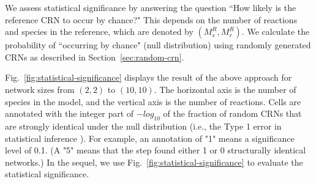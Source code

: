 \documentclass[webpdf,contemporary,large]{oup-authoring-template}
\newcommand{\revision}[1]{\color{red}{#1 }\color{black}}
\newcommand{\eqnref}[1]{
  Eq.~\ref{#1}}
\newcommand{\fig}[1]{
  Fig.~\ref{#1}}
\newcommand{\secref}[1]{Section~\ref{#1}}
\theoremstyle{thmstyleone}%
\theoremstyle{thmstyletwo}%
\theoremstyle{thmstylethree}%
\begin{document}
We assess statistical significance by answering the question ``How likely is the reference CRN to occur by chance?"
This depends on the number of reactions and species in the reference, which are denoted by $(M^R_s, M^R_r)$.
We calculate the probability of ``occurring by chance" (null distribution)
using
randomly generated CRNs as described in \secref{sec:random-crn}.
\revision{
\begin{itemize}
    \item Step (1): generate $K^R$ reference CRNs with size $(M_s^R, M_r^R)$;
    \item Step (2): generate $K^T$ target CRNs also of size $(M_s^R, M_r^R)$;
    \item Step (3): for each reference CRN in step (1), count the number of target CRNs in step (2) that are strongly structurally identical, and report the fraction of occurrences of strong structural identity.
\end{itemize}
$K^R$, $K^R$ should be sufficiently large so that there is little variability for the statistics
calculated in step (3).
We find that it is sufficient to use $K^R = 100, K^T=1000$.}

\fig{fig:statistical-significance} displays the result of the above approach for network sizes from $(2, 2)$ to $(10, 10)$.
The horizontal axis is the number of species in the model, and the vertical axis is the number of reactions.
Cells are annotated with the integer part of $-log_{10}$ of the fraction of random CRNs that are strongly identical under the null distribution (i.e., the Type 1 error in statistical inference \citep{lindgren_1993}).
For example, an annotation of "1" means a significance level of 0.1.
(A "5" means that the step found either 1 or 0 structurally identical networks.)
In the sequel, we use \fig{fig:statistical-significance} to evaluate the statistical significance.
\end{document}
